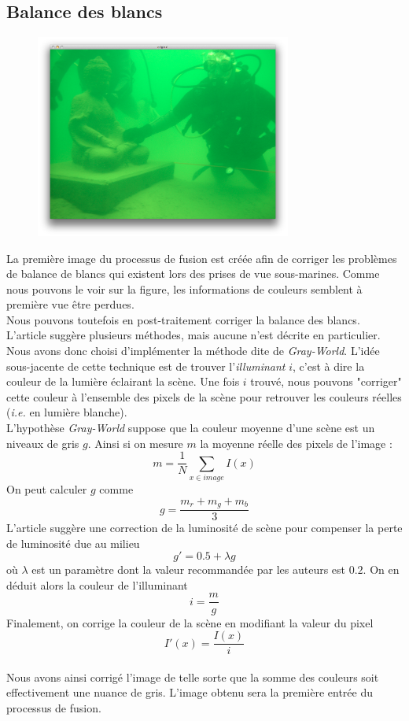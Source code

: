 \documentclass[twoside]{article}
\begin{document}
\subsection{Balance des blancs}

\begin{figure}[H]
  \centering
  \includegraphics[width=0.75\textwidth]{Support/input.png}
\end{figure}

La première image du processus de fusion est créée afin de corriger les problèmes de balance de blancs qui existent lors des prises de vue sous-marines. Comme nous pouvons le voir sur la figure, les informations de couleurs semblent à première vue être perdues.\\
Nous pouvons toutefois en post-traitement corriger la balance des blancs. L'article suggère plusieurs méthodes, mais aucune n'est décrite en particulier. Nous avons donc choisi d'implémenter la méthode dite de \emph{Gray-World}. L'idée sous-jacente de cette technique est de trouver l'\emph{illuminant} $i$, c'est à dire la couleur de la lumière éclairant la scène. Une fois $i$ trouvé, nous pouvons "corriger" cette couleur à l'ensemble des pixels de la scène pour retrouver les couleurs réelles (\emph{i.e.} en lumière blanche).\\
L'hypothèse \emph{Gray-World} suppose que la couleur moyenne d'une scène est un niveaux de gris $g$. Ainsi si on mesure $m$ la moyenne réelle des pixels de l'image : $$m = \frac{1}{N}\sum_{x \in image}I(x)$$ On peut calculer $g$ comme $$g = \frac{m_r + m_g + m_b}{3}$$ L'article suggère une correction de la luminosité de scène pour compenser la perte de luminosité due au milieu $$g' = 0.5 + \lambda g$$ où $\lambda$ est un paramètre dont la valeur recommandée par les auteurs est $0.2$. On en déduit alors la couleur de l'illuminant $$ i = \frac{m}{g}$$ Finalement, on corrige la couleur de la scène en modifiant la valeur du pixel $$I'(x) = \frac{I(x)}{i}$$\\
Nous avons ainsi corrigé l'image de telle sorte que la somme des couleurs soit effectivement une nuance de gris. L'image obtenu sera la première entrée du processus de fusion.
\end{document}
